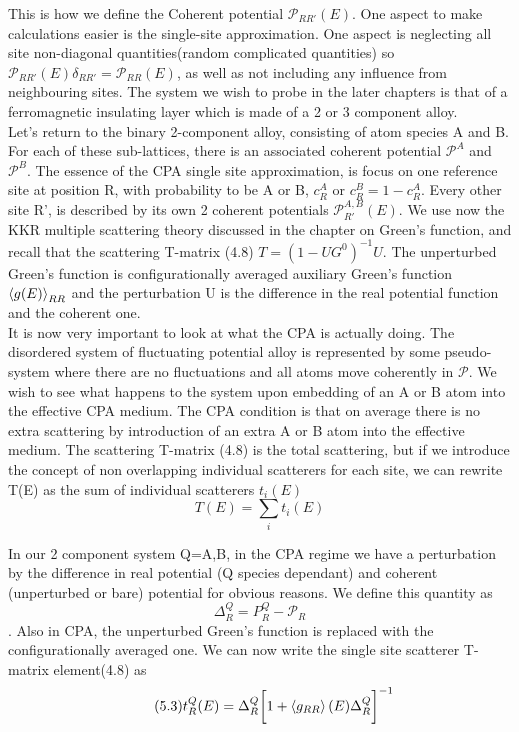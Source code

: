 \documentclass[12pt]{article}
\begin{document}
This is how we define the Coherent potential $\mathcal{P}_{RR'}(E)$. One aspect to make calculations easier is the single-site approximation. One aspect is neglecting all site non-diagonal quantities(random complicated quantities\cite{drchal}) so $\mathcal{P}_{RR'}(E)\delta_{RR'}=\mathcal{P}_{RR}(E)$\cite{turek}, as well as not including any influence from neighbouring sites. The system we wish to probe in the later chapters is that of a ferromagnetic insulating layer which is made of a 2 or 3 component alloy. 
\\Let's return to the binary 2-component alloy, consisting of atom species A and B. For each of these sub-lattices, there is an associated coherent potential $\mathcal{P}^A$ and $\mathcal{P}^B$. The essence of the CPA single site approximation, is focus on one reference site at position R, with probability to be A or B, $c_R^A$ or $c_R^B=1-c_R^A$. Every other site R', is described by its own 2 coherent potentials $\mathcal{P}_{R'}^{A,B}(E)$. We use now the KKR multiple scattering theory discussed in the chapter on Green's function, and recall that the scattering T-matrix (4.8) $T=(1-UG^0)^{-1}U$. The unperturbed Green's function is configurationally averaged auxiliary Green's function $\expval{g(E)}_{RR}$ and the perturbation U is the difference in the real potential function and the coherent one. 
\\
It is now very important to look at what the CPA is actually doing. The disordered system of fluctuating potential alloy is represented by some pseudo-system where there are no fluctuations and all atoms move coherently in $\mathcal{P}$. We wish to see what happens to the system upon embedding of an A or B atom into the effective CPA medium. The CPA condition is that on average there is no extra scattering by introduction of an extra A or B atom into the effective medium. The scattering T-matrix (4.8) is the total scattering, but if we introduce the concept of non overlapping individual scatterers for each site, we can rewrite T(E) as the sum of individual scatterers $t_i(E)$
$$T(E)=\sum_it_i(E)$$

In our 2 component system Q=A,B, in the CPA regime we have a perturbation by the difference in real potential (Q species dependant) and coherent (unperturbed or bare) potential for obvious reasons. We define this quantity as $$\Delta^Q_R=P_R^Q-\mathcal{P}_R$$. Also in CPA, the unperturbed Green's function is replaced with the configurationally averaged one. We can now write the single site scatterer T-matrix element(4.8) as 
\begin{equation} \label{4.1} \tag{5.3}
t_R^Q(E)=\Delta^Q_R\bigg[1+\expval{g_{RR}}(E)\Delta^Q_R\bigg]^{-1}
\end{equation}
\end{document}
